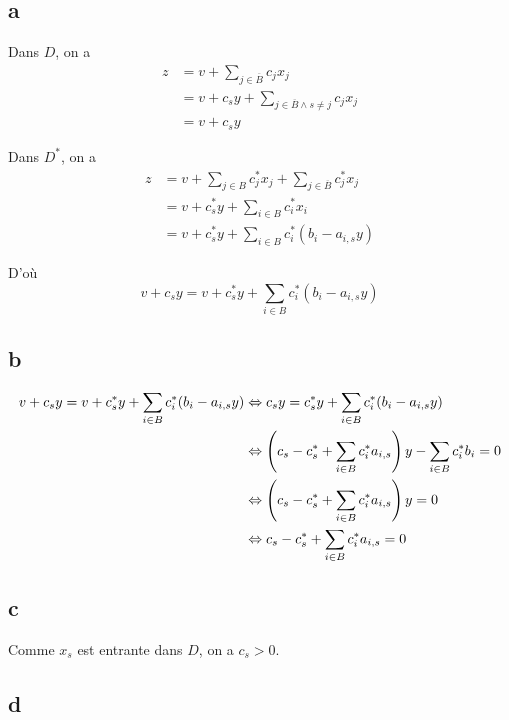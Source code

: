 \subsection*{a}

Dans $D$, on a 
\[
    \begin{aligned}
        z &= v + \sum\limits_{j\in\overline{B}} c_j x_j \\
        &= v + c_s y + \sum\limits_{j\in\overline{B} \wedge s\neq j} c_j x_j\\
        &= v + c_s y
    \end{aligned}
\]

Dans $D^*$, on a 
\[
    \begin{aligned}
        z &= v + \sum\limits_{j\in B} c_j^*x_j + \sum\limits_{j\in \overline{B}} c_j^*x_j \\
        &= v + c^*_s y + \sum\limits_{i\in B} c_i^* x_i \\
        &= v + c^*_s y + \sum\limits_{i\in B} c_i^* (b_i - a_{i,s}y)
    \end{aligned}
\]

D'où
\[
    v + c_s y = v + c^*_s y + \sum\limits_{i\in B} c_i^* (b_i - a_{i,s}y)
\]

\subsection*{b}

\[
    \begin{aligned}
        v + c_s y = v + c^*_s y + \sum\limits_{i\in B} c_i^* (b_i - a_{i,s}y) &\Leftrightarrow c_s y = c^*_s y + \sum\limits_{i\in B} c_i^* (b_i - a_{i,s}y)\\
        &\Leftrightarrow \left(c_s - c^*_s + \sum\limits_{i\in B} c_i^*  a_{i,s}\right) y - \sum\limits_{i\in B} c_i^* b_i = 0\\
        &\Leftrightarrow \left(c_s - c^*_s + \sum\limits_{i\in B} c_i^*  a_{i,s}\right) y =0\\
        &\Leftrightarrow c_s - c^*_s + \sum\limits_{i\in B} c_i^*  a_{i,s} =0
    \end{aligned}
\]

\subsection*{c}

Comme $x_s$ est entrante dans $D$, on a $c_s > 0$. 

\subsection*{d}

